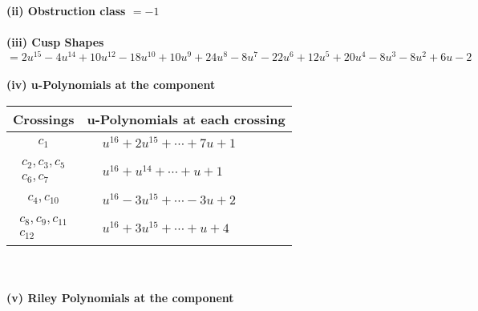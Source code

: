 \documentclass[1p]{elsarticle_modified}
\theoremstyle{definition}
\begin{document}
\flushleft \textbf{(ii) Obstruction class $= -1$}\\~\\
\flushleft \textbf{(iii) Cusp Shapes $= 2 u^{15}-4 u^{14}+10 u^{12}-18 u^{10}+10 u^9+24 u^8-8 u^7-22 u^6+12 u^5+20 u^4-8 u^3-8 u^2+6 u-2$}\\~\\
\newpage\renewcommand{\arraystretch}{1}
\flushleft \textbf{(iv) u-Polynomials at the component}\newline \\
\begin{tabular}{m{50pt}|m{274pt}}
Crossings & \hspace{64pt}u-Polynomials at each crossing \\
\hline $$\begin{aligned}c_{1}\end{aligned}$$&$\begin{aligned}
&u^{16}+2 u^{15}+\cdots+7 u+1
\end{aligned}$\\
\hline $$\begin{aligned}c_{2},c_{3},c_{5}\\c_{6},c_{7}\end{aligned}$$&$\begin{aligned}
&u^{16}+u^{14}+\cdots+u+1
\end{aligned}$\\
\hline $$\begin{aligned}c_{4},c_{10}\end{aligned}$$&$\begin{aligned}
&u^{16}-3 u^{15}+\cdots-3 u+2
\end{aligned}$\\
\hline $$\begin{aligned}c_{8},c_{9},c_{11}\\c_{12}\end{aligned}$$&$\begin{aligned}
&u^{16}+3 u^{15}+\cdots+u+4
\end{aligned}$\\
\hline
\end{tabular}\\~\\
\newpage\renewcommand{\arraystretch}{1}
\flushleft \textbf{(v) Riley Polynomials at the component}\newline \\
\end{document}
